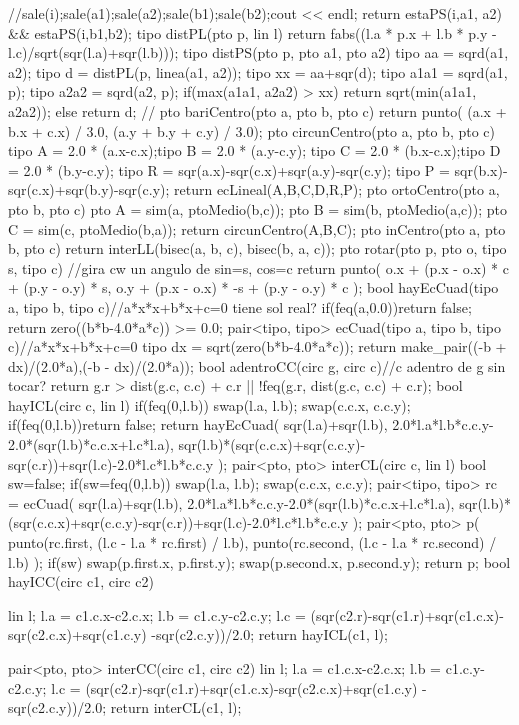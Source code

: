 \documentclass[10pt,landscape,twocolumn,a4paper,notitlepage]{article}
\begin{document}
\begin{code}
{  //sale(i);sale(a1);sale(a2);sale(b1);sale(b2);cout << endl;
  return estaPS(i,a1, a2) && estaPS(i,b1,b2);
}
tipo distPL(pto p, lin l){
  return fabs((l.a * p.x + l.b * p.y - l.c)/sqrt(sqr(l.a)+sqr(l.b)));
}
tipo distPS(pto p, pto a1, pto a2){
  tipo aa = sqrd(a1, a2);
  tipo d = distPL(p, linea(a1, a2));
  tipo xx = aa+sqr(d);
  tipo a1a1 = sqrd(a1, p);
  tipo a2a2 = sqrd(a2, p);
  if(max(a1a1, a2a2) > xx){
    return sqrt(min(a1a1, a2a2));
  }else{
    return d;
  }
}
//
pto bariCentro(pto a, pto b, pto c){
  return punto(
    (a.x + b.x + c.x) / 3.0,
    (a.y + b.y + c.y) / 3.0);
}
pto circunCentro(pto a, pto b, pto c){
  tipo A = 2.0 * (a.x-c.x);tipo B = 2.0 * (a.y-c.y);
  tipo C = 2.0 * (b.x-c.x);tipo D = 2.0 * (b.y-c.y);
  tipo R = sqr(a.x)-sqr(c.x)+sqr(a.y)-sqr(c.y);
  tipo P = sqr(b.x)-sqr(c.x)+sqr(b.y)-sqr(c.y);
  return ecLineal(A,B,C,D,R,P);
}
pto ortoCentro(pto a, pto b, pto c){
  pto A = sim(a, ptoMedio(b,c));
  pto B = sim(b, ptoMedio(a,c));
  pto C = sim(c, ptoMedio(b,a));
  return circunCentro(A,B,C);
}
pto inCentro(pto a, pto b, pto c){
  return interLL(bisec(a, b, c), bisec(b, a, c));
}
pto rotar(pto p, pto o, tipo s, tipo c){
  //gira cw un angulo de sin=s, cos=c
  return punto(
    o.x + (p.x - o.x) * c + (p.y - o.y) * s,
    o.y + (p.x - o.x) * -s + (p.y - o.y) * c
  );
}
bool hayEcCuad(tipo a, tipo b, tipo c){//a*x*x+b*x+c=0 tiene sol real?
  if(feq(a,0.0))return false;
  return zero((b*b-4.0*a*c)) >= 0.0;
}
pair<tipo, tipo> ecCuad(tipo a, tipo b, tipo c){//a*x*x+b*x+c=0
  tipo dx = sqrt(zero(b*b-4.0*a*c));
  return make_pair((-b + dx)/(2.0*a),(-b - dx)/(2.0*a));
}
bool adentroCC(circ g, circ c){//c adentro de g sin tocar?
  return g.r > dist(g.c, c.c) + c.r || !feq(g.r, dist(g.c, c.c) + c.r);
}
bool hayICL(circ c, lin l){
  if(feq(0,l.b)){
    swap(l.a, l.b);
    swap(c.c.x, c.c.y);
  }
  if(feq(0,l.b))return false;
  return hayEcCuad(
    sqr(l.a)+sqr(l.b),
    2.0*l.a*l.b*c.c.y-2.0*(sqr(l.b)*c.c.x+l.c*l.a),
    sqr(l.b)*(sqr(c.c.x)+sqr(c.c.y)-sqr(c.r))+sqr(l.c)-2.0*l.c*l.b*c.c.y
  );
}
pair<pto, pto> interCL(circ c, lin l){
  bool sw=false;
  if(sw=feq(0,l.b)){
    swap(l.a, l.b);
    swap(c.c.x, c.c.y);
  }
  pair<tipo, tipo> rc = ecCuad(
    sqr(l.a)+sqr(l.b),
    2.0*l.a*l.b*c.c.y-2.0*(sqr(l.b)*c.c.x+l.c*l.a),
    sqr(l.b)*(sqr(c.c.x)+sqr(c.c.y)-sqr(c.r))+sqr(l.c)-2.0*l.c*l.b*c.c.y
  );
  pair<pto, pto> p(
    punto(rc.first, (l.c - l.a * rc.first) / l.b),
    punto(rc.second, (l.c - l.a * rc.second) / l.b)
  );
  if(sw){
    swap(p.first.x, p.first.y);
    swap(p.second.x, p.second.y);
  }
  return p;
}
bool hayICC(circ c1, circ c2){
  lin l;
  l.a = c1.c.x-c2.c.x;
  l.b = c1.c.y-c2.c.y;
  l.c = (sqr(c2.r)-sqr(c1.r)+sqr(c1.c.x)-sqr(c2.c.x)+sqr(c1.c.y)
    -sqr(c2.c.y))/2.0;
  return hayICL(c1, l);

}
pair<pto, pto> interCC(circ c1, circ c2){
  lin l;
  l.a = c1.c.x-c2.c.x;
  l.b = c1.c.y-c2.c.y;
  l.c = (sqr(c2.r)-sqr(c1.r)+sqr(c1.c.x)-sqr(c2.c.x)+sqr(c1.c.y)
    -sqr(c2.c.y))/2.0;
  return interCL(c1, l);
}
\end{code}
\end{document}
